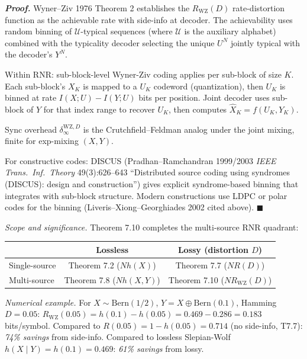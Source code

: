 \documentclass[
]{article}
\begin{document}
\emph{\textbf{Proof.}} Wyner--Ziv 1976 Theorem 2 establishes the
$R_{\mathrm{WZ}}(D)$ rate-distortion function as the achievable rate
with side-info at decoder. The achievability uses random binning of
$\mathcal{U}$-typical sequences (where $\mathcal{U}$ is the auxiliary
alphabet) combined with the typicality decoder selecting the unique
$U^N$ jointly typical with the decoder's $Y^N$.

Within RNR: sub-block-level Wyner-Ziv coding applies per sub-block of
size $K$. Each sub-block's $X_K$ is mapped to a $U_K$ codeword
(quantization), then $U_K$ is binned at rate $I(X; U) - I(Y; U)$ bits
per position. Joint decoder uses sub-block of $Y$ for that index range
to recover $U_K$, then computes $\hat{X}_K = f(U_K, Y_K)$.

Sync overhead $\delta_\infty^{\mathrm{WZ}, D}$ is the Crutchfield--Feldman
analog under the joint mixing, finite for exp-mixing $(X, Y)$.

For constructive codes: DISCUS (Pradhan--Ramchandran 1999/2003
\emph{IEEE Trans.\ Inf.\ Theory} 49(3):626--643 ``Distributed source
coding using syndromes (DISCUS): design and construction'') gives
explicit syndrome-based binning that integrates with sub-block
structure.
Modern constructions use LDPC or polar codes for the binning
(Liveris--Xiong--Georghiades 2002 cited above).
\hfill$\blacksquare$

\emph{Scope and significance.} Theorem 7.10 completes the multi-source
RNR quadrant:

\begin{center}
\begin{tabular}{l|c|c}
              & Lossless                          & Lossy (distortion $D$)            \\ \hline
Single-source & Theorem 7.2 ($N h(X)$)            & Theorem 7.7 ($N R(D)$)            \\
Multi-source  & Theorem 7.8 ($N h(X, Y)$)         & Theorem 7.10 ($N R_{\mathrm{WZ}}(D)$) \\
\end{tabular}
\end{center}

\emph{Numerical example.} For $X \sim \mathrm{Bern}(1/2)$, $Y = X
\oplus \mathrm{Bern}(0.1)$, Hamming $D = 0.05$:
$R_{\mathrm{WZ}}(0.05) = h(0.1) - h(0.05) = 0.469 - 0.286 = 0.183$ bits/symbol.
Compared to $R(0.05) = 1 - h(0.05) = 0.714$ (no side-info, T7.7):
\emph{74\% savings} from side-info.
Compared to lossless Slepian-Wolf $h(X \mid Y) = h(0.1) = 0.469$:
\emph{61\% savings} from lossy.
\end{document}
